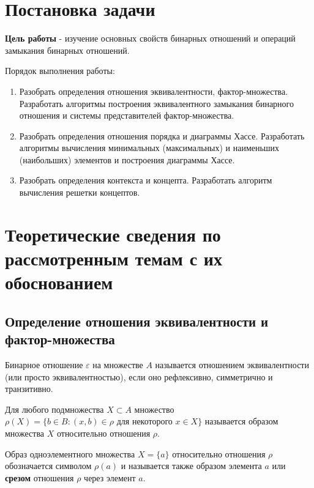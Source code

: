 \documentclass[bachelor, och, labwork]{shiza}
\begin{document}

\section{Постановка задачи}

    \textbf{Цель работы} - изучение основных свойств бинарных отношений и операций замыкания бинарных отношений. 

    Порядок выполнения работы:
    \begin{enumerate}
        \item Разобрать определения отношения эквивалентности, фактор-множества. Разработать алгоритмы построения
        эквивалентного замыкания бинарного отношения и системы представителей фактор-множества.
        \item Разобрать определения отношения порядка и диаграммы Хассе. Разработать алгоритмы вычисления минимальных
        (максимальных) и наименьших (наибольших) элементов  и построения диаграммы Хассе.
        \item Разобрать определения контекста и концепта. Разработать алгоритм вычисления решетки концептов.
    \end{enumerate}

\section{Теоретические сведения по рассмотренным темам с их обоснованием}

    \subsection{Определение отношения эквивалентности и фактор-множества}

        Бинарное отношение $\varepsilon$ на множестве $A$ называется отношением эквивалентности (или просто эквивалентностью), если оно рефлексивно, симметрично и транзитивно.

        Для любого подмножества $X \subset A$ множество $\rho(X) = \{b \in B: (x, b) \in \rho \text{ для некоторого } x \in X\}$ называется образом множества $X$ относительно отношения $\rho$.

        Образ одноэлементного множества $X = \{a\}$ относительно отношения $\rho$ обозначается символом $\rho(a)$ и называется также образом элемента $a$ или \textbf{срезом} отношения $\rho$ через элемент $a$. 
\end{document}
